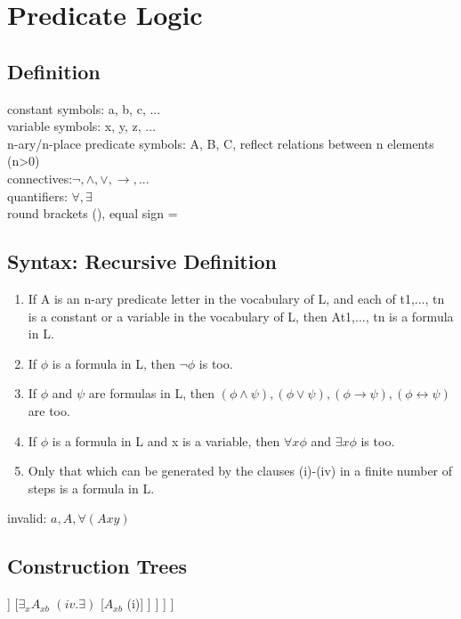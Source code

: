 \section{Predicate Logic}

\subsection*{Definition}
constant symbols: a, b, c, ... \\
variable symbols: x, y, z, ... \\
n-ary/n-place predicate symbols: A, B, C, reflect relations between n elements (n>0) \\
connectives:$\neg, \land, \lor, \to, ...$ \\
quantifiers: $\forall, \exists$ \\
round brackets (), equal sign =

\subsection*{Syntax: Recursive Definition}
\begin{enumerate}
\item If A is an n-ary predicate letter in the vocabulary of L, and each of
t1,..., tn is a constant or a variable in the vocabulary of L, then
At1,..., tn is a formula in L.
\item If $\phi$ is a formula in L, then $\neg \phi$ is too.
\item If $\phi$ and $\psi$ are formulas in L, then $(\phi \land \psi), (\phi \lor \psi), (\phi \to \psi), (\phi \leftrightarrow \psi)$ are too.
\item If $\phi$ is a formula in L and x is a variable, then $\forall x \phi$ and $\exists x \phi$ is too.
\item Only that which can be generated by the clauses (i)-(iv) in a finite
number of steps is a formula in L.
\end{enumerate}
invalid: $a, A, \forall(Axy)$ \\

\subsection*{Construction Trees}
\begin{forest}
[$\forall_x \forall_y ((A_{xy} \land B_y) \to \exists_x A_{xb})$ $(iv. \forall)$
	[$\forall_y ((A_{xy} \land B_y) \to \exists_x A_{xb})$ $(iv. \forall)$
		[$(A_{xy} \land B_y) \to \exists_x A_{xb}$ $(iii. \to)$
			[$A_{xy} \land B_y$ $(iii. \land)$
				[$A_{xy}$ (i)]
				[$B_y$ (i)]
			]
			[$\exists_x A_{xb}$ $(iv. \exists)$
				[$A_{xb}$ (i)]
			]
		]
	]
]
\end{forest}


